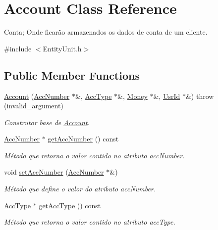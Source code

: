\hypertarget{classAccount}{\section{Account Class Reference}
\label{d7/d10/classAccount}
}


Conta; Onde ficarão armazenados os dados de conta de um cliente.  




{\ttfamily \#include $<$Entity\-Unit.\-h$>$}

\subsection*{Public Member Functions}
\begin{DoxyCompactItemize}
\item 
\hyperlink{classAccount_a90c0bf7174be29449688428b13383079}{Account} (\hyperlink{classAccNumber}{Acc\-Number} $\ast$\&, \hyperlink{classUsrType}{Acc\-Type} $\ast$\&, \hyperlink{classMoney}{Money} $\ast$\&, \hyperlink{classUsrId}{Usr\-Id} $\ast$\&)  throw (invalid\-\_\-argument)
\begin{DoxyCompactList}\small\item\em Construtor base de \hyperlink{classAccount}{Account}. \end{DoxyCompactList}\item 
\hyperlink{classAccNumber}{Acc\-Number} $\ast$ \hyperlink{classAccount_a007e233a2a3f23c74a9a8eccddc70ef6}{get\-Acc\-Number} () const 
\begin{DoxyCompactList}\small\item\em Método que retorna o valor contido no atributo acc\-Number. \end{DoxyCompactList}\item 
void \hyperlink{classAccount_a4e21d38d94259e0abfa3c6f46ad56322}{set\-Acc\-Number} (\hyperlink{classAccNumber}{Acc\-Number} $\ast$\&)
\begin{DoxyCompactList}\small\item\em Método que define o valor do atributo acc\-Number. \end{DoxyCompactList}\item 
\hyperlink{classUsrType}{Acc\-Type} $\ast$ \hyperlink{classAccount_a18fc73dc189390ffce257a1d0f03f2b3}{get\-Acc\-Type} () const 
\begin{DoxyCompactList}\small\item\em Método que retorna o valor contido no atributo acc\-Type. \end{DoxyCompactList}\item 

\end{DoxyCompactItemize}
